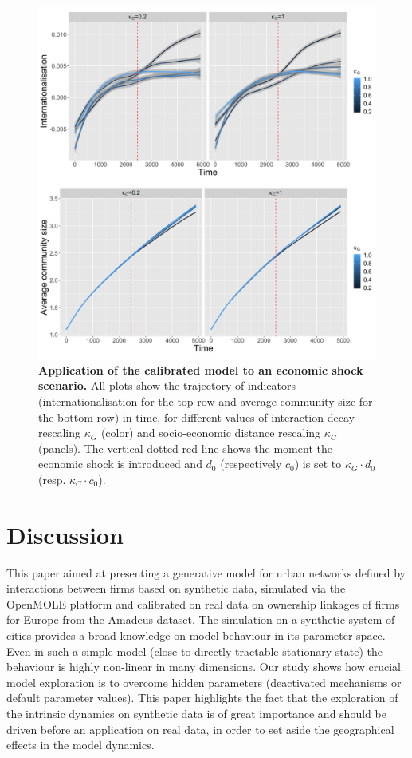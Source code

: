 \documentclass[10pt,letterpaper]{article}
\begin{document}
\begin{figure}
	\begin{center}
    \includegraphics[width=\linewidth]{figures/Fig9.png}
    \end{center}
	\caption{\textbf{Application of the calibrated model to an economic shock scenario.} All plots show the trajectory of indicators (internationalisation for the top row and average community size for the bottom row) in time, for different values of interaction decay rescaling $\kappa_G$ (color) and socio-economic distance rescaling $\kappa_C$ (panels). The vertical dotted red line shows the moment the economic shock is introduced and $d_0$ (respectively $c_0$) is set to $\kappa_G \cdot d_0$ (resp. $\kappa_C \cdot c_0$).\label{fig:fig9}}
\end{figure}



\section*{Discussion}

This paper aimed at presenting a generative model for urban networks defined by interactions between firms based on synthetic data, simulated via the OpenMOLE platform and calibrated on real data on ownership linkages of firms for Europe from the Amadeus dataset. The simulation on a synthetic system of cities provides a broad knowledge on model behaviour in its parameter space. Even in such a simple model (close to directly tractable stationary state) the behaviour is highly non-linear in many dimensions. Our study shows how crucial model exploration is to overcome hidden parameters (deactivated mechanisms or default parameter values). This paper highlights the fact that the exploration of the intrinsic dynamics on synthetic data is of great importance and should be driven before an application on real data, in order to set aside the geographical effects in the model dynamics.
\end{document}
